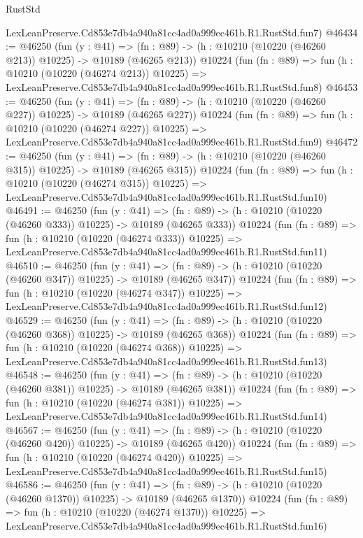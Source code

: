 \begin{lexlean}{RustStd}
\begin{coremodule}
    LexLeanPreserve.Cd853e7db4a940a81cc4ad0a999ec461b.R1.RustStd.fun7)
@46434 := @46250
    (fun (y : @41) =>
    (fn : @89) -> (h : @10210 (@10220 (@46260 @213)) @10225) -> @10189 (@46265 @213))
    @10224
    (fun (fn : @89) =>
    fun (h : @10210 (@10220 (@46274 @213)) @10225) =>
    LexLeanPreserve.Cd853e7db4a940a81cc4ad0a999ec461b.R1.RustStd.fun8)
@46453 := @46250
    (fun (y : @41) =>
    (fn : @89) -> (h : @10210 (@10220 (@46260 @227)) @10225) -> @10189 (@46265 @227))
    @10224
    (fun (fn : @89) =>
    fun (h : @10210 (@10220 (@46274 @227)) @10225) =>
    LexLeanPreserve.Cd853e7db4a940a81cc4ad0a999ec461b.R1.RustStd.fun9)
@46472 := @46250
    (fun (y : @41) =>
    (fn : @89) -> (h : @10210 (@10220 (@46260 @315)) @10225) -> @10189 (@46265 @315))
    @10224
    (fun (fn : @89) =>
    fun (h : @10210 (@10220 (@46274 @315)) @10225) =>
    LexLeanPreserve.Cd853e7db4a940a81cc4ad0a999ec461b.R1.RustStd.fun10)
@46491 := @46250
    (fun (y : @41) =>
    (fn : @89) -> (h : @10210 (@10220 (@46260 @333)) @10225) -> @10189 (@46265 @333))
    @10224
    (fun (fn : @89) =>
    fun (h : @10210 (@10220 (@46274 @333)) @10225) =>
    LexLeanPreserve.Cd853e7db4a940a81cc4ad0a999ec461b.R1.RustStd.fun11)
@46510 := @46250
    (fun (y : @41) =>
    (fn : @89) -> (h : @10210 (@10220 (@46260 @347)) @10225) -> @10189 (@46265 @347))
    @10224
    (fun (fn : @89) =>
    fun (h : @10210 (@10220 (@46274 @347)) @10225) =>
    LexLeanPreserve.Cd853e7db4a940a81cc4ad0a999ec461b.R1.RustStd.fun12)
@46529 := @46250
    (fun (y : @41) =>
    (fn : @89) -> (h : @10210 (@10220 (@46260 @368)) @10225) -> @10189 (@46265 @368))
    @10224
    (fun (fn : @89) =>
    fun (h : @10210 (@10220 (@46274 @368)) @10225) =>
    LexLeanPreserve.Cd853e7db4a940a81cc4ad0a999ec461b.R1.RustStd.fun13)
@46548 := @46250
    (fun (y : @41) =>
    (fn : @89) -> (h : @10210 (@10220 (@46260 @381)) @10225) -> @10189 (@46265 @381))
    @10224
    (fun (fn : @89) =>
    fun (h : @10210 (@10220 (@46274 @381)) @10225) =>
    LexLeanPreserve.Cd853e7db4a940a81cc4ad0a999ec461b.R1.RustStd.fun14)
@46567 := @46250
    (fun (y : @41) =>
    (fn : @89) -> (h : @10210 (@10220 (@46260 @420)) @10225) -> @10189 (@46265 @420))
    @10224
    (fun (fn : @89) =>
    fun (h : @10210 (@10220 (@46274 @420)) @10225) =>
    LexLeanPreserve.Cd853e7db4a940a81cc4ad0a999ec461b.R1.RustStd.fun15)
@46586 := @46250
    (fun (y : @41) =>
    (fn : @89) -> (h : @10210 (@10220 (@46260 @1370)) @10225) -> @10189 (@46265 @1370))
    @10224
    (fun (fn : @89) =>
    fun (h : @10210 (@10220 (@46274 @1370)) @10225) =>
    LexLeanPreserve.Cd853e7db4a940a81cc4ad0a999ec461b.R1.RustStd.fun16)

\end{coremodule}
\end{lexlean}
